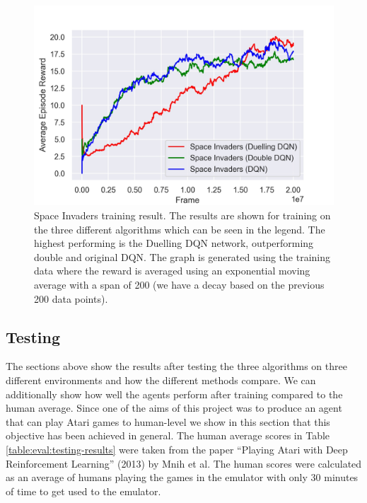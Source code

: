 \begin{figure}[htbp]
  \centering
  \includegraphics[width=1.0\textwidth]{chapters/chapter5/images/si_plot.jpg}
  \caption[Space Invaders training result plot]{Space Invaders training result. The results are shown for training on the three different algorithms which can be seen in the legend. The highest performing is the Duelling DQN network, outperforming double and original DQN. The graph is generated using the training data where the reward is averaged using an exponential moving average with a span of 200 (we have a decay based on the previous 200 data points).
    \label{fig:si-train-results}
  }
\end{figure}

\subsection{Testing}

The sections above show the results after testing the three algorithms on three different environments and how the different methods compare. We can additionally show how well the agents perform after training compared to the human average. Since one of the aims of this project was to produce an agent that can play Atari games to human-level we show in this section that this objective has been achieved in general. The human average scores in Table \ref{table:eval:testing-results} were taken from the paper ``Playing Atari with Deep Reinforcement Learning'' (2013) by Mnih et al. The human scores were calculated as an average of humans playing the games in the emulator with only 30 minutes of time to get used to the emulator.

